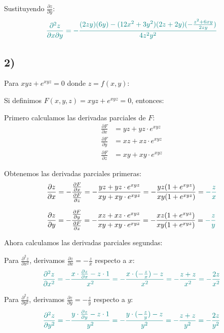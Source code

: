 \documentclass{article}
\begin{document}
  Sustituyendo $\frac{\partial z}{\partial y}$:
  \begin{equation}\color{teal}
  \frac{\partial^2 z}{\partial x \partial y} = -\frac{(2zy)(6y) - (12x^2 + 3y^2)(2z + 2y)(-\frac{z^2 + 6xy}{2zy})}{4z^2y^2}
  \end{equation}

\subsection*{2)}
Para $xyz + e^{xyz} = 0$ donde $z = f(x,y)$:
  
  Si definimos $F(x,y,z) = xyz + e^{xyz} = 0$, entonces:
  
  Primero calculamos las derivadas parciales de $F$:
  \begin{align}
  \frac{\partial F}{\partial x} &= yz + yz \cdot e^{xyz} \\
  \frac{\partial F}{\partial y} &= xz + xz \cdot e^{xyz} \\
  \frac{\partial F}{\partial z} &= xy + xy \cdot e^{xyz}
  \end{align}
  
  Obtenemos las derivadas parciales primeras:
  \begin{equation}
  \frac{\partial z}{\partial x} = -\frac{\frac{\partial F}{\partial x}}{\frac{\partial F}{\partial z}} = -\frac{yz + yz \cdot e^{xyz}}{xy + xy \cdot e^{xyz}} = -\frac{yz(1 + e^{xyz})}{xy(1 + e^{xyz})} = \color{teal} -\frac{z}{x}
  \end{equation}
  
  \begin{equation}
  \frac{\partial z}{\partial y} = -\frac{\frac{\partial F}{\partial y}}{\frac{\partial F}{\partial z}} = -\frac{xz + xz \cdot e^{xyz}}{xy + xy \cdot e^{xyz}} = -\frac{xz(1 + e^{xyz})}{xy(1 + e^{xyz})} = \color{teal}-\frac{z}{y}
  \end{equation}
  
  Ahora calculamos las derivadas parciales segundas:
  
  Para $\frac{\partial^2 z}{\partial x^2}$, derivamos $\frac{\partial z}{\partial x} = -\frac{z}{x}$ respecto a $x$:
  \begin{equation}\color{teal}
  \frac{\partial^2 z}{\partial x^2} = -\frac{x \cdot \frac{\partial z}{\partial x} - z \cdot 1}{x^2} = -\frac{x \cdot (-\frac{z}{x}) - z}{x^2} = -\frac{z + z}{x^2} = -\frac{2z}{x^2}
  \end{equation}
  
  Para $\frac{\partial^2 z}{\partial y^2}$, derivamos $\frac{\partial z}{\partial y} = -\frac{z}{y}$ respecto a $y$:
  \begin{equation}\color{teal}
  \frac{\partial^2 z}{\partial y^2} = -\frac{y \cdot \frac{\partial z}{\partial y} - z \cdot 1}{y^2} = -\frac{y \cdot (-\frac{z}{y}) - z}{y^2} = -\frac{z + z}{y^2} = -\frac{2z}{y^2}
  \end{equation}
  
\end{document}
